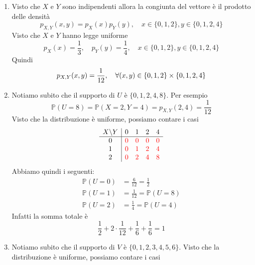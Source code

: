 \documentclass[a4paper]{article}
\begin{document}
\begin{snippetsolution}{}
    \begin{enumerate}
        \item Visto che \(X\) e \(Y\) sono indipendenti allora la congiunta del vettore è il prodotto delle densità
            \[
                p_{X,Y}(x,y) = p_X(x)p_Y(y), \quad x\in\{0,1,2\}, y \in \{0,1,2,4\}
            \]
            Visto che \(X\) e \(Y\) hanno legge uniforme
            \[
                p_X(x) = \frac13, \quad p_Y(y) = \frac14, \quad x\in\{0,1,2\}, y \in \{0,1,2,4\}
            \]
            Quindi
            \[
                p_{X,Y}(x,y) = \frac{1}{12},
                \quad \forall (x,y) \in \{0,1,2\} \times \{0,1,2,4\}
            \]
        \item Notiamo subito che il supporto di \(U\)
            è \(\{0,1,2,4,8\}\). Per esempio
            \[
                \mathbb P(U = 8) = \mathbb P(X=2, Y=4) = p_{X,Y}(2,4) = \frac{1}{12}
            \]
            Visto che la distribuzione è uniforme, possiamo contare i casi
            \[
                \begin{array}{c|cccc}
                    X \backslash Y & 0 & 1 & 2 & 4 \\
                    \hline
                    0 & \textcolor{red}{0} & \textcolor{red}{0} & \textcolor{red}{0} & \textcolor{red}{0} \\
                    1 & \textcolor{red}{0} & \textcolor{red}{1} & \textcolor{red}{2} & \textcolor{red}{4} \\
                    2 & \textcolor{red}{0} & \textcolor{red}{2} & \textcolor{red}{4} & \textcolor{red}{8}
                \end{array}
            \]
            Abbiamo quindi i seguenti:
            \begin{align*}
                \mathbb P(U=0) &= \frac{6}{12} = \frac12 \\
                \mathbb P(U=1) &= \frac{1}{12} = \mathbb P(U=8) \\
                \mathbb P(U=2) &= \frac{1}{4} = \mathbb P(U=4)
            \end{align*}
            Infatti la somma totale è
            \[
                \frac12 + 2 \cdot \frac1{12} + \frac16 + \frac16 = 1
            \]
        \item Notiamo subito che il supporto di \(V\)
            è \(\{0,1,2,3,4,5,6\}\).
            Visto che la distribuzione è uniforme, possiamo contare i casi
            \[
                \begin{array}{c|cccc}

\end{array}\]
\end{enumerate}
\end{snippetsolution}
\end{document}
